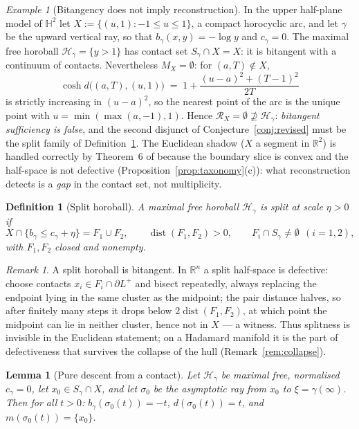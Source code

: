 \documentclass[11pt]{article}
\newtheorem{lemma}[theorem]{Lemma}
\newtheorem{definition}[theorem]{Definition}
\theoremstyle{remark}
\newtheorem{remark}[theorem]{Remark}
\newtheorem{example}[theorem]{Example}
\newcommand{\R}{\mathbb{R}}
\newcommand{\X}{X}
\newcommand{\Mx}{M_{\X}}
\newcommand{\Rx}{\mathcal{R}_{\X}}
\newcommand{\Hb}[1]{\mathcal{H}_{#1}}
\newcommand{\Sb}[1]{S_{#1}}
\newcommand{\dist}{\operatorname{dist}}
\begin{document}
\begin{example}[Bitangency does not imply reconstruction]
\label{ex:arc}
In the upper half-plane model of $\mathbb{H}^{2}$ let
$\X:=\{(u,1) : -1\le u\le 1\}$, a compact horocyclic arc, and let
$\gamma$ be the upward vertical ray, so that
$b_{\gamma}(x,y)=-\log y$ and $c_{\gamma}=0$. The maximal free
horoball $\Hb{\gamma}=\{y>1\}$ has contact set
$\Sb{\gamma}\cap\X=\X$: it is bitangent with a continuum of contacts.
Nevertheless $\Mx=\emptyset$: for $(a,T)\notin\X$,
\[
\cosh d\bigl((a,T),(u,1)\bigr)\;=\;1+\frac{(u-a)^{2}+(T-1)^{2}}{2T}
\]
is strictly increasing in $(u-a)^{2}$, so the nearest point of the
arc is the unique point with $u=\min(\max(a,-1),1)$. Hence
$\Rx=\emptyset\not\supseteq\Hb{\gamma}$: \emph{bitangent sufficiency
is false}, and the second disjunct of
Conjecture~\ref{conj:revised} must be the split family of
Definition~\ref{def:split}. The Euclidean shadow ($\X$ a segment in
$\R^{2}$) is handled correctly by Theorem~6 of \cite{Bia} because the
boundary slice is convex and the half-space is not defective
(Proposition~\ref{prop:taxonomy}(c)): what reconstruction detects is
a \emph{gap} in the contact set, not multiplicity.
\end{example}

\begin{definition}[Split horoball]\label{def:split}
A maximal free horoball $\Hb{\gamma}$ is \emph{split at scale
$\eta>0$} if
\[
\X\cap\{b_{\gamma}\le c_{\gamma}+\eta\}=F_{1}\cup F_{2},\qquad
\dist(F_{1},F_{2})>0,\qquad
F_{i}\cap \Sb{\gamma}\neq\emptyset\ \ (i=1,2),
\]
with $F_{1},F_{2}$ closed and nonempty.
\end{definition}

\begin{remark}\label{rem:split-vs-defective}
A split horoball is bitangent. In $\R^{n}$ a split half-space is
defective: choose contacts $x_{i}\in F_{i}\cap\partial L^{+}$ and
bisect repeatedly, always replacing the endpoint lying in the same
cluster as the midpoint; the pair distance halves, so after finitely
many steps it drops below $2\dist(F_{1},F_{2})$, at which point the
midpoint can lie in neither cluster, hence not in $\X$ --- a witness.
Thus splitness is invisible in the Euclidean statement; on a Hadamard
manifold it is the part of defectiveness that survives the collapse
of the hull (Remark~\ref{rem:collapse}).
\end{remark}

\begin{lemma}[Pure descent from a contact]\label{lem:pure}
Let $\Hb{\gamma}$ be maximal free, normalised $c_{\gamma}=0$, let
$x_{0}\in \Sb{\gamma}\cap\X$, and let $\sigma_{0}$ be the asymptotic
ray from $x_{0}$ to $\xi=\gamma(\infty)$. Then for all $t>0$:
$b_{\gamma}(\sigma_{0}(t))=-t$, $d(\sigma_{0}(t))=t$, and
$m(\sigma_{0}(t))=\{x_{0}\}$.
\end{lemma}
\end{document}
